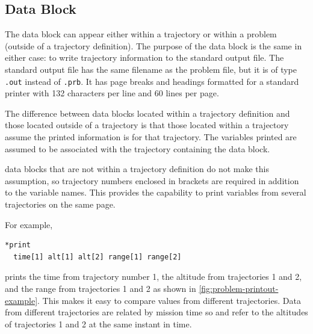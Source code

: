 \subsection{ Data Block}\label{sec:problem-block-print}

The  data block can appear either within a trajectory or within
a problem (outside of a trajectory definition). The purpose of the
 data block is the same in either case: to write trajectory
information to the standard output file. The standard output file has the same
filename as the problem file, but it is of type \texttt{.out} instead of
\texttt{.prb}. It has page breaks and headings formatted for a standard printer with
132 characters per line and 60 lines per page.

The difference between  data blocks located within a
trajectory definition and those located outside of a trajectory is that those located
within a trajectory assume the printed information is for that trajectory. The
variables printed are assumed to be associated with the trajectory containing the
 data block.

 data blocks that are not within a trajectory definition do not
make this assumption, so trajectory numbers enclosed in brackets are required in
addition to the variable names. This provides the capability to print variables from
several trajectories on the same page.

For example,

\begin{lstlisting}[style=taosmanual]
*print
  time[1] alt[1] alt[2] range[1] range[2]
\end{lstlisting}

prints the time from trajectory number 1, the altitude from trajectories 1 and 2, and
the range from trajectories 1 and 2 as shown in
\cref{fig:problem-printout-example}. This makes it easy to compare values from
different trajectories. Data from different trajectories are related by mission time so
 and  refer to the altitudes of trajectories 1 and 2
at the same instant in time.

\begin{center}
  \begin{minipage}{0.92\linewidth}
    
    \label{fig:problem-printout-example}
  \end{minipage}
\end{center}

